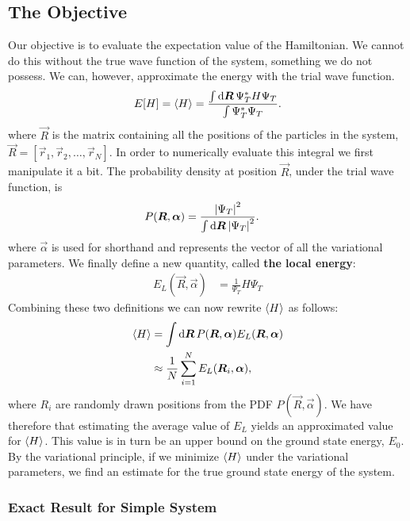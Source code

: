 \documentclass[twocolumn]{article}
\begin{document}
\subsection{The Objective}
Our objective is to evaluate the expectation value of the Hamiltonian. We cannot do this
without the true wave function of the system, something we do not possess.
We can, however, approximate the energy with the trial wave function.
\begin{align}
    E[H] = \expval{H} = \frac{\int \dd{\bm R} \Psi^*_T H \Psi_T}{\int
    \Psi_T^*\Psi_T}.
\end{align}
where $\vec R$ is the matrix containing all the positions of the particles in
the system, $\vec R = [\vec r_1, \vec r_2, \dots, \vec r_N]$.
In order to numerically evaluate this integral we first manipulate it a bit.
The probability density at position $\vec R$, under the trial wave function, is
\begin{align}
    P(\bm R, \bm \alpha) &= \frac{\abs{\Psi_T}^2}{\int \dd{\bm R}\abs{\Psi_T}^2}.
\end{align}
where $\vec \alpha$ is used for shorthand and represents the vector of all the variational parameters.
We finally define a new quantity, called \textbf{the local energy}:
\begin{align}
    E_L(\vec R, \vec \alpha) &= \frac{1}{\Psi_T}H\Psi_T\label{eq:E_L}
\end{align}
Combining these two definitions we can now rewrite $\expval{H}$ as follows:
\begin{align}
    \begin{split}
        \expval{H} &= \int \dd{\bm R} P(\bm R,\bm\alpha) E_L(\bm R,\bm\alpha)\\
        &\approx
        \frac{1}{N}\sum_{i=1}^N E_L(\bm R_i,\bm\alpha),
    \end{split}\label{eq:the-objective}
\end{align}
where $R_i$ are randomly drawn positions from the PDF $P(\vec R, \vec\alpha)$.
We have therefore that estimating the average value of $E_L$ yields an
approximated value for $\expval{H}$. This value is in turn be an upper bound on the
ground state energy, $E_0$. By the variational principle, if we minimize
$\expval{H}$ under the variational parameters, we find an estimate for the true
ground state energy of the system.

\subsubsection{Exact Result for Simple System}
\end{document}
